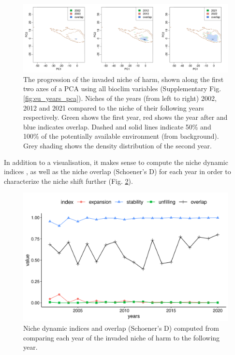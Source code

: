 \documentclass[12pt,a4paper]{article}
\begin{document}
\begin{figure}[!h]
    \centering
    \includegraphics[width = \linewidth]{"../../R/figures/eu-niche-ys.png"}
    \caption{\label{fig:eu_niche_ys} The progression of the invaded niche of \gls{harm}, shown along the first two axes of a PCA using all bioclim variables (Supplementary Fig. \ref{fig:eu_years_pca}). Niches of the years (from left to right) 2002, 2012 and 2021 compared to the niche of their following years respectively. Green shows the first year, red shows the year after and blue indicates overlap. Dashed and solid lines indicate 50\% and 100\% of the potentially available environment (from background). Grey shading shows the density distribution of the second year.}

\end{figure}

In addition to a visualisation, it makes sense to compute the niche dynamic indices \autocite{guisan2014nichedyn}, as well as the niche overlap (Schoener's D) for each year in order to characterize the niche shift further (Fig. \ref{fig:eu_niche_dyn}).

\begin{figure}[!h]
    \centering
    \includegraphics[width = 0.9\linewidth]{"../../R/figures/eu-niche-dyn.png"}
    \caption{\label{fig:eu_niche_dyn} Niche dynamic indices and overlap (Schoener's D) computed from comparing each year of the invaded niche of \gls{harm} to the following year.}
\end{figure}
\end{document}
